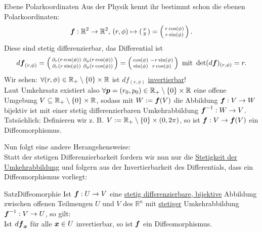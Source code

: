 \begin{Beispiel}
{Ebene Polarkoordinaten}
Aus der Physik kennt ihr bestimmt schon die ebenen Polarkoordinaten:
\begin{equation*}
    {{\text{\boldmath${f}$}}}:\mathbb{R}^2\to\mathbb{R}^2,\,(r,\phi)\mapsto\left(\begin{smallmatrix}x\\y\end{smallmatrix}\right)=\left(\begin{smallmatrix}r\cos(\phi)\\r\sin(\phi)\end{smallmatrix}\right).
\end{equation*}
Diese sind stetig differenzierbar, das Differential ist
\begin{equation*}
    d{{\text{\boldmath${f}$}}}_{(r,\phi)}=\left(\begin{smallmatrix}\partial_r(r\cos(\phi))&\partial_\phi(r\cos(\phi))\\\partial_r(r\sin(\phi))&\partial_\phi(r\cos(\phi))\end{smallmatrix}\right)=\left(\begin{smallmatrix}\cos(\phi)&-r\sin(\phi)\\\sin(\phi)&r\cos(\phi)\end{smallmatrix}\right)\text{ mit }\det(d{{\text{\boldmath${f}$}}})_{(r,\phi)}=r.
\end{equation*}
Wir sehen: $\forall(r,\phi)\in\mathbb{R}_+\setminus\left\{0\right\}\times \mathbb{R}$ ist $df_{(r,\phi)}$ \underline{invertierbar}!\\
Laut Umkehrsatz existiert also $\forall{{\text{\boldmath${p}$}}}=(r_0,p_0)\in\mathbb{R}_+\setminus\left\{0\right\}\times \mathbb{R}$ eine offene Umgebung $V\subseteq\mathbb{R}_+\setminus\left\{0\right\}\times \mathbb{R}$, sodass mit $W:={{\text{\boldmath${f}$}}}(V)$ die Abbildung ${{\text{\boldmath${f}$}}}:V\to W$ bijektiv ist mit einer stetig differenzierbaren Umkehrabbildung ${{\text{\boldmath${f}$}}}^{-1}:W\to V$.\\
Tatsächlich: Definieren wir z. B. $V:=\mathbb{R}_+\setminus\left\{0\right\}\times (0,2\pi)$, so ist ${{\text{\boldmath${f}$}}}:V\to {{\text{\boldmath${f}$}}}(V)$ ein Diffeomorphismus.
\end{Beispiel}
Nun folgt eine andere Herangehensweise:\\
Statt der stetigen Differenzierbarkeit fordern wir nun nur die \underline{Stetigkeit der Umkehrabbildung} und folgern aus der Invertierbarkeit des Differentials, dass ein Diffeomorphismus vorliegt:
\begin{Satz}
{Satz}{Diffeomorphie}
Ist ${{\text{\boldmath${f}$}}}:U\to V$ eine \underline{stetig differenzierbare, bijektive} Abbildung zwischen offenen Teilmengen $U$ und $V$ des $\mathbb{R}^n$ mit \underline{stetiger} Umkehrabbildung ${{\text{\boldmath${f}$}}}^{-1}:V\to U$, so gilt:\\
Ist $d{{\text{\boldmath${f}$}}}_{{\text{\boldmath${x}$}}}$ für alle ${{\text{\boldmath${x}$}}}\in U$ invertierbar, so ist ${{\text{\boldmath${f}$}}}$ ein Diffeomorphismus.
\end{Satz}
